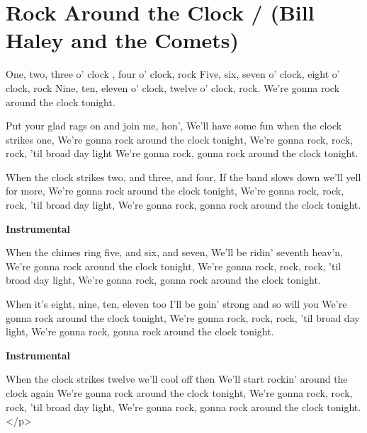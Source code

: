 \section{Rock Around the Clock / (Bill Haley and the Comets)}\label{sec:rock_around_the_clock}


One, two, three o' clock , four o' clock, rock
Five, six, seven o' clock, eight o' clock, rock
Nine, ten, eleven o' clock, twelve o' clock, rock.
We're gonna rock around the clock tonight.

Put your glad rags on and join me, hon',
We'll have some fun when the clock strikes one,
We're gonna rock around the clock tonight,
We're gonna rock, rock, rock, 'til broad day light
We're gonna rock, gonna rock around the clock 
tonight.

When the clock strikes two, and three, and four,
If the band slows down we'll yell for more,
We're gonna rock around the clock tonight,
We're gonna rock, rock, rock, 'til broad day light,
We're gonna rock, gonna rock around the clock 
tonight.

\textbf{Instrumental}
                         

When the chimes ring five, and six, and seven,
We'll be ridin' seventh heav'n,
We're gonna rock around the clock tonight,
We're gonna rock, rock, rock, 'til broad day light,
We're gonna rock, gonna rock around the clock 
tonight.

When it's eight, nine, ten, eleven too
I'll be goin' strong and so will you
We're gonna rock around the clock tonight,
We're gonna rock, rock, rock, 'til broad day light,
We're gonna rock, gonna rock around the clock 
tonight.

\textbf{Instrumental}
                         

When the clock strikes twelve we'll cool off then
We'll start rockin' around the clock again
We're gonna rock around the clock tonight,
We're gonna rock, rock, rock, 'til broad day light,
We're gonna rock, gonna rock around the clock 
tonight.</p>
